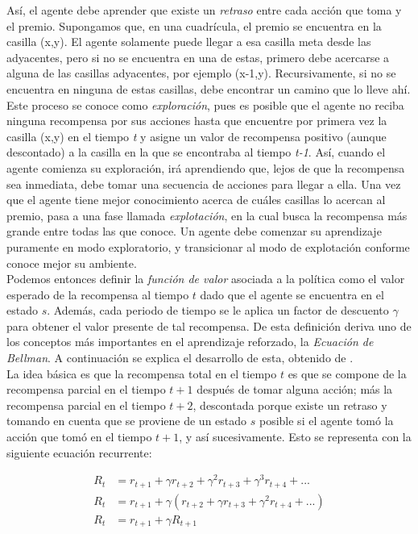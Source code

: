 As\'i, el agente debe aprender que existe un \textit{retraso} entre cada acci\'on que toma y el premio. Supongamos que, en una cuadr\'icula, el premio se encuentra en la casilla (x,y). El agente solamente puede llegar a esa casilla meta desde las adyacentes, pero si no se encuentra en una de estas, primero debe acercarse a alguna de las casillas adyacentes, por ejemplo (x-1,y). Recursivamente, si no se encuentra en ninguna de estas casillas, debe encontrar un camino que lo lleve ah\'i. Este proceso se conoce como \textit{exploraci\'on}, pues es posible que el agente no reciba ninguna recompensa por sus acciones hasta que encuentre por primera vez la casilla (x,y) en el tiempo \textit{t} y asigne un valor de recompensa positivo (aunque descontado) a la casilla en la que se encontraba al tiempo \textit{t-1}. As\'i, cuando el agente comienza su exploraci\'on, ir\'a aprendiendo que, lejos de que la recompensa sea inmediata, debe tomar una secuencia de acciones para llegar a ella. Una vez que el agente tiene mejor conocimiento acerca de cu\'ales casillas lo acercan al premio, pasa a una fase llamada \textit{explotaci\'on}, en la cual busca la recompensa m\'as grande entre todas las que conoce. Un agente debe comenzar su aprendizaje puramente en modo exploratorio, y transicionar al modo de explotaci\'on conforme conoce mejor su ambiente.\\

Podemos entonces definir la \textit{funci\'on de valor} asociada a la pol\'itica como el valor esperado de la recompensa al tiempo $t$ dado que el agente se encuentra en el estado $s$. Adem\'as, cada periodo de tiempo se le aplica un factor de descuento $\gamma$ para obtener el valor presente de tal recompensa. De esta definici\'on deriva uno de los conceptos m\'as importantes en el aprendizaje reforzado, la \textit{Ecuaci\'on de Bellman}. A continuaci\'on se explica el desarrollo de esta, obtenido de \citet{Sutton}. \\

La idea b\'asica es que la recompensa total en el tiempo $t$ es que se compone de la recompensa parcial en el tiempo $t+1$ despu\'es de tomar alguna acci\'on; m\'as la recompensa parcial en el tiempo $t+2$, descontada porque existe un retraso y tomando en cuenta que se proviene de un estado $s$ posible si el agente tom\'o la acci\'on que tom\'o en el tiempo $t+1$, y as\'i sucesivamente. Esto se representa con la siguiente ecuaci\'on recurrente:

\vspace{-30pt}
\begin{align*}
R_{t} &= r_{t+1} + \gamma r_{t+2} + \gamma^{2} r_{t+3} + \gamma^{3} r_{t+4} + ... \\
R_{t} &= r_{t+1} + \gamma \left( r_{t+2} + \gamma r_{t+3} + \gamma^{2}r_{t+4} + ...  \right)  \\
R_{t} &= r_{t+1} + \gamma R_{t+1}
\end{align*}

